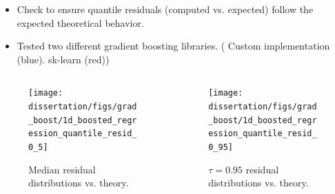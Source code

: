 \documentclass[t, pdftex]{beamer}
\begin{document}
\begin{frame}
\vspace{-16pt}
\begin{itemize}
    \item Check to ensure quantile residuals (computed vs. expected) follow the expected theoretical behavior.
    \item Tested two different gradient boosting libraries.  ({\color{utblue} Custom implementation  (blue)}. {\color{utred} sk-learn (red)})
\end{itemize}
\vspace{-28pt}
\begin{columns}
    \begin{column}{0.5\textwidth}
        \begin{figure}
            \centering
            \texttt{[image: dissertation/figs/grad\_boost/1d\_boosted\_regression\_quantile\_resid\_0\_5]}
            \caption{\centering \scriptsize Median residual distributions vs. theory.}
        \end{figure}
    \end{column}
    \begin{column}{0.5\textwidth}  %
        \begin{figure}
            \centering
            \texttt{[image: dissertation/figs/grad\_boost/1d\_boosted\_regression\_quantile\_resid\_0\_95]}\\
            \caption{\centering \scriptsize $\tau=0.95$ residual distributions vs. theory.}
        \end{figure}
    \end{column}
\end{columns}
\end{frame}

\end{document}
